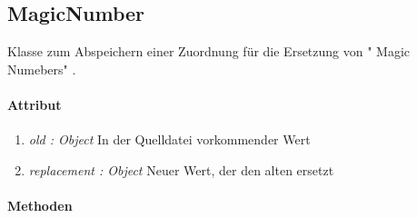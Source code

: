\subsection{MagicNumber}
Klasse zum Abspeichern einer Zuordnung für die Ersetzung von \string" Magic Numebers\string" .

\paragraph{Attribut}
\begin{enumerate}[-]
\item \textit{old : Object} In der Quelldatei vorkommender Wert
\item \textit{replacement : Object} Neuer Wert, der den alten ersetzt
\end{enumerate}
\paragraph{Methoden}
